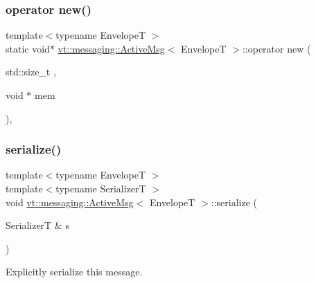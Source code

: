 \mbox{\label{structvt_1_1messaging_1_1_active_msg_a03927a2881ef7e3308765361cb89c606}} 
\subsubsection{\texorpdfstring{operator new()}{operator new()}\hspace{0.1cm}{\footnotesize\ttfamily [3/3]}}
{\footnotesize\ttfamily template$<$typename EnvelopeT $>$ \\
static void$\ast$ \hyperlink{structvt_1_1messaging_1_1_active_msg}{vt\+::messaging\+::\+Active\+Msg}$<$ EnvelopeT $>$\+::operator new (\begin{DoxyParamCaption}\item[{std\+::size\+\_\+t}]{,  }\item[{void $\ast$}]{mem }\end{DoxyParamCaption})\hspace{0.3cm}{\ttfamily [inline]}, {\ttfamily [static]}}

\mbox{\label{structvt_1_1messaging_1_1_active_msg_a758f02bef5991c48d6c9a56c30ca7ad9}} 
\subsubsection{\texorpdfstring{serialize()}{serialize()}}
{\footnotesize\ttfamily template$<$typename EnvelopeT $>$ \\
template$<$typename SerializerT $>$ \\
void \hyperlink{structvt_1_1messaging_1_1_active_msg}{vt\+::messaging\+::\+Active\+Msg}$<$ EnvelopeT $>$\+::serialize (\begin{DoxyParamCaption}\item[{SerializerT \&}]{s }\end{DoxyParamCaption})\hspace{0.3cm}{\ttfamily [inline]}}



Explicitly serialize this message. 

